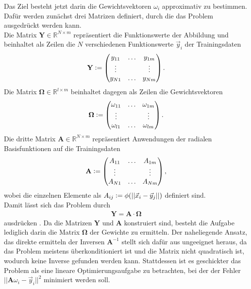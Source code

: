 Das Ziel besteht jetzt darin die Gewichtsvektoren $\omega_i$ approximativ zu bestimmen. Dafür werden zunächst drei Matrizen definiert, durch die das Problem ausgedrückt werden kann.\\
Die Matrix $\mathbf{Y} \in \mathbb{R}^{N \times m}$ repräsentiert die Funktionswerte der Abbildung und beinhaltet als Zeilen die $N$ verschiedenen Funktionswerte $\vec{y}_i$ der Trainingsdaten
\begin{align}
\mathbf{Y} \vcentcolon=
\begin{pmatrix}
y_{11} & \ldots  & y_{1m} \\
\vdots & & \vdots \\
y_{N1} & \ldots  & y_{Nm} \\
\end{pmatrix}.
\end{align}
Die Matrix $\mathbf{\Omega} \in \mathbb{R}^{l \times m}$ beinhaltet dagegen als Zeilen die Gewichtsvektoren
\begin{align}
\mathbf{\Omega} \vcentcolon=
\begin{pmatrix}
\omega_{11} & \ldots  & \omega_{1m} \\
\vdots & & \vdots \\
\omega_{l1} & \ldots  & \omega_{lm} \\
\end{pmatrix}.
\end{align}
Die dritte Matrix $\mathbf{A} \in \mathbb{R}^{N \times m}$ repräsentiert Anwendungen der radialen Basisfunktionen auf die Trainingsdaten 
\begin{align}
\mathbf{A} \vcentcolon=
\begin{pmatrix}
A_{11} & \ldots  & A_{1m} \\
\vdots & & \vdots \\
A_{N1} & \ldots  & A_{Nm} \\
\end{pmatrix},
\end{align}
wobei die einzelnen Elemente als $A_{ij} \vcentcolon= \phi(|| \vec{x}_i - \vec{y}_j ||)$ definiert sind.\\
Damit lässt sich das Problem durch
\begin{align}
\mathbf{Y} = \mathbf{A} \cdot \mathbf{\Omega}
\end{align}
ausdrücken \citep{lowe2multi}. Da die Matrizen $\mathbf{Y}$ und $\mathbf{A}$ konstruiert sind, besteht die Aufgabe lediglich darin die Matrix $\mathbf{\Omega}$ der Gewichte zu ermitteln. Der naheliegende Ansatz, das direkte ermitteln der Inversen $\mathbf{A}^{-1}$ stellt sich dafür aus ungeeignet heraus, da das Problem meistens überkonditioniert ist und die Matrix nicht quadratisch ist, wodurch keine Inverse gefunden werden kann. Stattdessen ist es geschickter das Problem als eine lineare Optimierungsaufgabe zu betrachten, bei der der Fehler $||\mathbf{A} \omega_i - \vec{y}_i||^2$ minimiert werden soll.\\

